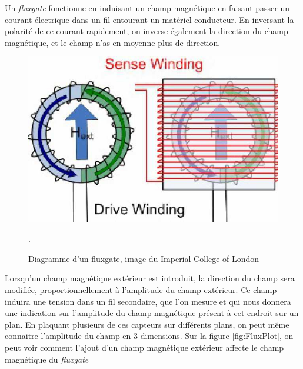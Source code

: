\documentclass[a4paper, 12pt, titlepage, oneside, french]{article}
\begin{document}
	Un \textit{fluxgate} fonctionne en induisant un champ magnétique en faisant passer un courant électrique dans un fil entourant un matériel conducteur. En inversant la polarité de ce courant rapidement, on inverse également la direction du champ magnétique, et le champ n'as en moyenne plus de direction.
	\begin{figure}[H]
		\centering
		\includegraphics[width=\textwidth, height=0.9\textheight, keepaspectratio]{FluxgateDiagram.jpg}
		\caption{Diagramme d'un fluxgate, image du Imperial College of London}. 
		\label{fig:FluxDiag}
	\end{figure}
	Lorsqu'un champ magnétique extérieur est introduit, la direction du champ sera modifiée, proportionnellement à l'amplitude du champ extérieur. Ce champ induira une tension dans un fil secondaire, que l'on mesure et qui nous donnera une indication sur l'amplitude du champ magnétique présent à cet endroit sur un plan. En plaquant plusieurs de ces capteurs sur différents plans, on peut même connaitre l'amplitude du champ en 3 dimensions. Sur la figure \ref{fig:FluxPlot}, on peut voir comment l'ajout d'un champ magnétique extérieur affecte le champ magnétique du \textit{fluxgate}
\end{document}
